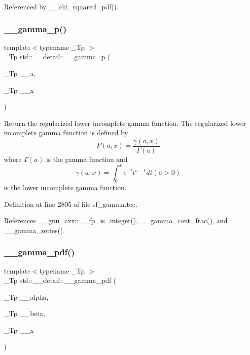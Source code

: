Referenced by \+\_\+\+\_\+chi\+\_\+squared\+\_\+pdf().

\mbox{\label{namespacestd_1_1____detail_a4583981bd73c3d3bba970c2f91dc4ba5}} 
\subsubsection{\texorpdfstring{\+\_\+\+\_\+gamma\+\_\+p()}{\_\_gamma\_p()}\hspace{0.1cm}{\footnotesize\ttfamily [2/2]}}
{\footnotesize\ttfamily template$<$typename \+\_\+\+Tp $>$ \\
\+\_\+\+Tp std\+::\+\_\+\+\_\+detail\+::\+\_\+\+\_\+gamma\+\_\+p (\begin{DoxyParamCaption}\item[{\+\_\+\+Tp}]{\+\_\+\+\_\+a,  }\item[{\+\_\+\+Tp}]{\+\_\+\+\_\+x }\end{DoxyParamCaption})}



Return the regularized lower incomplete gamma function. The regularized lower incomplete gamma function is defined by \[ P(a,x) = \frac{\gamma(a,x)}{\Gamma(a)} \] where $ \Gamma(a) $ is the gamma function and \[ \gamma(a,x) = \int_0^x e^{-t}t^{a-1}dt (a > 0) \] is the lower incomplete gamma function. 



Definition at line 2805 of file sf\+\_\+gamma.\+tcc.



References \+\_\+\+\_\+gnu\+\_\+cxx\+::\+\_\+\+\_\+fp\+\_\+is\+\_\+integer(), \+\_\+\+\_\+gamma\+\_\+cont\+\_\+frac(), and \+\_\+\+\_\+gamma\+\_\+series().

\mbox{\label{namespacestd_1_1____detail_a13146321e4e094815de990c33b83b02a}} 
\subsubsection{\texorpdfstring{\+\_\+\+\_\+gamma\+\_\+pdf()}{\_\_gamma\_pdf()}}
{\footnotesize\ttfamily template$<$typename \+\_\+\+Tp $>$ \\
\+\_\+\+Tp std\+::\+\_\+\+\_\+detail\+::\+\_\+\+\_\+gamma\+\_\+pdf (\begin{DoxyParamCaption}\item[{\+\_\+\+Tp}]{\+\_\+\+\_\+alpha,  }\item[{\+\_\+\+Tp}]{\+\_\+\+\_\+beta,  }\item[{\+\_\+\+Tp}]{\+\_\+\+\_\+x }\end{DoxyParamCaption})}




